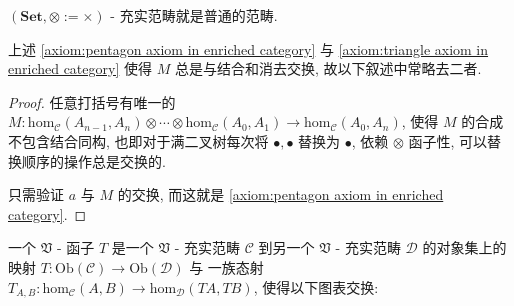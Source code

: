 \begin{corollary}
    \((\mathbf{Set}, \otimes := \times)\) - 充实范畴就是普通的范畴.
\end{corollary}

\begin{remark}
    上述 \ref{axiom:pentagon axiom in enriched category} 与 \ref{axiom:triangle axiom in enriched category} 使得 \(M\) 总是与结合和消去交换,
    故以下叙述中常略去二者.

    \begin{proof}
        任意打括号有唯一的 \(M : \mathrm{hom}_\mathcal{C} (A_{n-1},A_n) \otimes \cdots \otimes \mathrm{hom}_\mathcal{C} (A_0,A_1) \to \mathrm{hom}_{\mathcal{C}} (A_0,A_n)\),
        使得 \(M\) 的合成不包含结合同构, 也即对于满二叉树每次将 \({{\bullet},{\bullet}}\) 替换为 \({\bullet}\),
        依赖 \(\otimes\) 函子性, 可以替换顺序的操作总是交换的.

        只需验证 \(a\) 与 \(M\) 的交换, 而这就是 \ref{axiom:pentagon axiom in enriched category}.
    \end{proof}
\end{remark}

\begin{definition}
    一个 \(\mathfrak{V}\) - 函子 \(T\) 是一个 \(\mathfrak{V}\) - 充实范畴 \(\mathcal{C}\) 到另一个 \(\mathfrak{V}\) - 充实范畴 \(\mathcal{D}\) 的对象集上的映射 \(T : \mathrm{Ob} (\mathcal{C}) \to \mathrm{Ob} (\mathcal{D})\) 与
    一族态射 \(T_{A,B} : \mathrm{hom}_{\mathcal{C}} (A,B) \to \mathrm{hom}_{\mathcal{D}} (TA,TB)\), 使得以下图表交换:

    \begin{center}
    \end{center}

    \begin{center}
    \end{center}
\end{definition}

